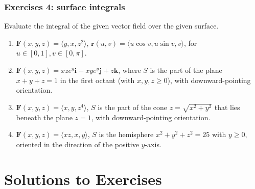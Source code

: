 \documentclass[12pt,letterpaper]{article}
\renewcommand{\r}{\mathbf{r}}
\newcommand{\F}{\mathbf{F}}
\renewcommand{\i}{\mathbf{i}}
\renewcommand{\j}{\mathbf{j}}
\renewcommand{\k}{\mathbf{k}}
\begin{document}
\subsubsection{Exercises 4: surface integrals}
Evaluate the integral of the given vector field over the given surface.
\begin{enumerate}
 \item $\F(x,y,z) = \langle y, x, z^2\rangle$, $\r(u,v) = \langle u\cos v, u\sin v, v\rangle$, for $u\in [0,1], v\in [0,\pi]$.
 \item $\F(x,y,z) = xze^y\i-xye^y\j +z\k$, where $S$ is the part of the plane $x+y+z=1$ in the first octant (with $x,y,z\geq 0$), with downward-pointing orientation.
 \item $\F(x,y,z) = \langle x, y, z^4\rangle$, $S$ is the part of the cone $z=\sqrt{x^2+y^2}$ that lies beneath the plane $z=1$, with downward-pointing orientation.
 \item $\F(x,y,z) = \langle xz, x, y\rangle$, $S$ is the hemisphere $x^2+y^2+z^2=25$ with $y\geq 0$, oriented in the direction of the positive $y$-axis.
\end{enumerate}
\section{Solutions to Exercises}
\end{document}
